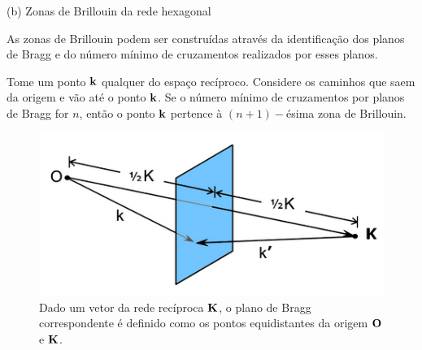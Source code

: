 \documentclass[aspectratio=169]{beamer}
\begin{document}
\begin{frame}{(b) Zonas de Brillouin da rede hexagonal}

As zonas de Brillouin podem ser construídas através da identificação dos planos de Bragg e do número mínimo de cruzamentos realizados por esses planos.

\n\n

Tome um ponto $\vb{k}$ qualquer do espaço recíproco. Considere os caminhos que saem da origem e vão até o ponto $\vb{k}$. Se o número mínimo de cruzamentos por planos de Bragg for $n$, então o ponto $\vb{k}$ pertence à $(n+1)-$ésima zona de Brillouin.

\begin{figure}[H]
\centering
\includegraphics[width=0.4\linewidth]{fig/bragg-plane.png}
\caption{Dado um vetor da rede recíproca $\vb{K}$, o plano de Bragg correspondente é definido como os pontos equidistantes da origem $\vb{O}$ e $\vb{K}$.}
\label{fig:bragg-plane}
\end{figure}

\end{frame}


\end{document}
